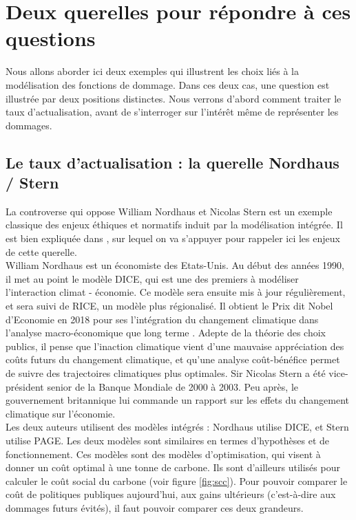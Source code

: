 
\section{Deux querelles pour répondre à ces questions}

Nous allons aborder ici deux exemples qui illustrent les choix liés à la modélisation des fonctions de dommage. Dans ces deux cas, une question est illustrée par deux positions distinctes. Nous verrons d'abord comment traiter le taux d'actualisation, avant de s'interroger sur l'intérêt même de représenter les dommages. 

\subsection{Le taux d'actualisation : la querelle Nordhaus / Stern}

La controverse qui oppose William Nordhaus et Nicolas Stern est un exemple classique des enjeux éthiques et normatifs induit par la modélisation intégrée. Il est bien expliquée dans \textcite{guigourez_10_2023}, sur lequel on va s'appuyer pour rappeler ici les enjeux de cette querelle. \\

William Nordhaus est un économiste des Etats-Unis. Au début des années 1990, il met au point le modèle DICE, qui est une des premiers à modéliser l'interaction climat - économie. Ce modèle sera ensuite mis à jour régulièrement, et sera suivi de RICE, un modèle plus régionalisé. Il obtient le Prix dit Nobel d'Economie en 2018 pour ses l'intégration du changement climatique dans l'analyse macro-économique que long terme \autocite{noauthor_william_nodate-1}. Adepte de la théorie des choix publics, il pense que l'inaction climatique vient d'une mauvaise appréciation des coûts futurs du changement climatique, et qu'une analyse coût-bénéfice permet de suivre des trajectoires climatiques plus optimales. 
Sir Nicolas Stern a été vice-président senior de la Banque Mondiale de 2000 à 2003. Peu après, le gouvernement britannique lui commande un rapport sur les effets du changement climatique sur l'économie. \\

Les deux auteurs utilisent des modèles intégrés : Nordhaus utilise DICE, et Stern utilise PAGE. Les deux modèles sont similaires en termes d'hypothèses et de fonctionnement. Ces modèles sont des modèles d'optimisation, qui visent à donner un coût optimal à une tonne de carbone. Ils sont d'ailleurs utilisés pour calculer le coût social du carbone (voir figure \ref{fig:scc}). Pour pouvoir comparer le coût de politiques publiques aujourd'hui, aux gains ultérieurs (c'est-à-dire aux dommages futurs évités), il faut pouvoir comparer ces deux grandeurs. \\

